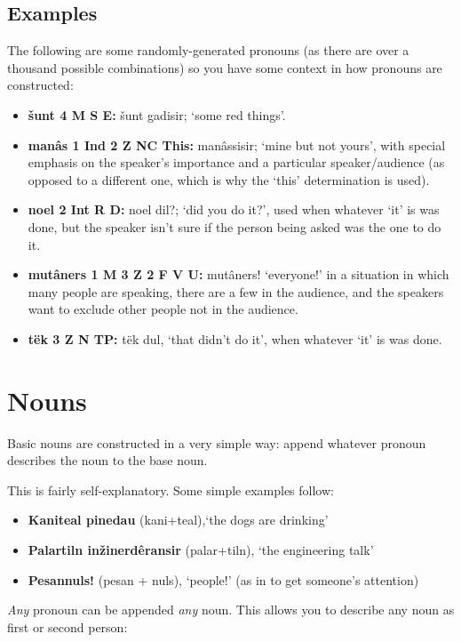 \documentclass[12pt]{report}
\begin{document}
\subsection{Examples}
The following are some randomly-generated pronouns (as there are over a thousand possible combinations) so you have some context in how pronouns are constructed:

\begin{itemize}
\item \textbf{\v sunt \tiny{4 M S E}:} \v sunt gadisir; `some red things'.
\item \textbf{man\^as \tiny{1 Ind 2 Z NC This}:} man\^ assisir; 	`mine but not yours', with special emphasis on the speaker's importance and a particular speaker/audience (as opposed to a different one, which is why the `this' determination is used).
\item \textbf{noel \tiny{2 Int R D}:} noel dil?; `did you do it?', used when whatever `it' is was done, but the speaker isn't sure if the person being asked was the one to do it.
\item \textbf{mut\^aners \tiny{1 M 3 Z 2 F V U}:} mut\^aners! `everyone!' in a situation in which many people are speaking, there are a few in the audience, and the speakers want to exclude other people not in the audience.
\item \textbf{t\" ek \tiny{3 Z N TP}:} t\" ek dul, `that didn't do it', when whatever `it' is was done.
\end{itemize}

\section{Nouns}
Basic nouns are constructed in a very simple way: append whatever pronoun describes the noun to the base noun. 

This is fairly self-explanatory. Some simple examples follow:

\begin{itemize}
\item \textbf{Kaniteal pinedau} (kani+teal),`the dogs are drinking'
\item \textbf{Palartiln in\v zinerd\^ eransir} (palar+tiln), `the engineering talk'
\item \textbf{Pesannuls!} (pesan + nuls), `people!' (as in to get someone's attention)
\end{itemize}

\textit{Any} pronoun can be appended \textit{any} noun. This allows you to describe any noun as first or second person:
\end{document}
